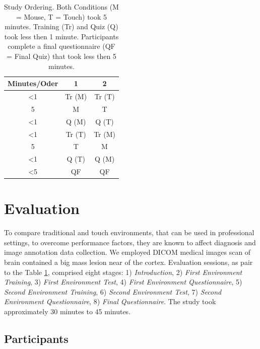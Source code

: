 \documentclass{sigchi}
\newcommand\tabhead[1]{\small\textbf{#1}}
\begin{document}
\begin{table}
  \centering
  \def\arraystretch{1.5}
  \begin{tabular}{|c|c|c|}
    \hline
    \tabhead{Minutes/Oder} &
    \multicolumn{1}{|p{0.3\columnwidth}|}{\centering\tabhead{1}} &
    \multicolumn{1}{|p{0.3\columnwidth}|}{\centering\tabhead{2}} \\
    \hline
    \textless 1 & Tr (M) & Tr (T) \\
    \hline
    5 & M & T \\
    \hline
    \textless 1 & Q (M) & Q (T) \\
    \hline
    \textless 1 & Tr (T) & Tr (M) \\
    \hline
    5 & T & M \\
    \hline
    \textless 1 & Q (T) & Q (M) \\
    \hline
    \textless 5 & QF & QF \\
    \hline
  \end{tabular}
  \caption{Study Ordering. Both Conditions (M = Mouse, T = Touch) took 5 minutes. Training (Tr) and Quiz (Q) took less then 1 minute. Participants complete a final questionnaire (QF = Final Quiz) that took less then 5 minutes.}
  \label{study_ordering}
\end{table}

\section{Evaluation}

To compare traditional and touch environments, that can be used in professional settings, to overcome performance factors, they are known to affect diagnosis and image annotation data collection. We employed DICOM \cite{mildenberger2002introduction} medical images scan of brain contained a big mass lesion near of the cortex. Evaluation sessions, as pair to the Table \ref{study_ordering}, comprised eight stages: 1) \textit{Introduction}, 2) \textit{First Environment Training}, 3) \textit{First Environment Test}, 4) \textit{First Environment Questionnaire}, 5) \textit{Second Environment Training}, 6) \textit{Second Environment Test}, 7) \textit{Second Environment Questionnaire}, 8) \textit{Final Questionnaire}. The study took approximately 30 minutes to 45 minutes.

\subsection{Participants}
\end{document}
